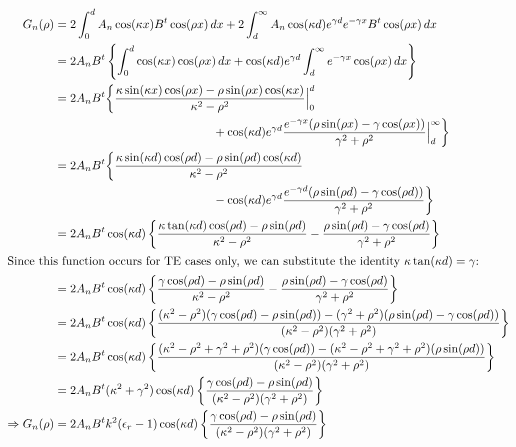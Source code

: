 \documentclass[11pt, oneside]{article}   	%
\begin{document}
\begin{align*}
G_{n}(\rho) &= 2 \int_{0}^{d} A_{n}\cos(\kappa x) B^{t}\cos(\rho x) \, dx + 2\int_{d}^{\infty} A_{n}\cos(\kappa d)e^{\gamma d}e^{-\gamma x} B^{t}\cos(\rho x) \, dx \\
&= 2A_{n}B^{t} \left\{ \int_{0}^{d} \cos(\kappa x) \cos(\rho x) \, dx + \cos(\kappa d)e^{\gamma d} \int_{d}^{\infty} e^{-\gamma x} \cos(\rho x) \, dx \right\} \\
&= 2A_{n}B^{t} \bigg\{ \frac{\kappa\sin(\kappa x) \cos(\rho x) - \rho\sin(\rho x) \cos(\kappa x)}{\kappa^{2}-\rho^{2}} \Big|_{0}^{d}  \\
	&\hspace{132px} {} + \cos(\kappa d)e^{\gamma d} \frac{e^{-\gamma x}(\rho \sin(\rho x) - \gamma \cos(\rho x))}{\gamma^{2} + \rho^{2}} \Big|_{d}^{\infty}  \bigg\} \\
&= 2A_{n}B^{t} \bigg\{ \frac{\kappa\sin(\kappa d) \cos(\rho d) - \rho\sin(\rho d) \cos(\kappa d)}{\kappa^{2}-\rho^{2}}  \\
	&\hspace{132px} {} - \cos(\kappa d)e^{\gamma d} \frac{e^{-\gamma d}(\rho \sin(\rho d) - \gamma \cos(\rho d))}{\gamma^{2} + \rho^{2}}  \bigg\} \\
&= 2A_{n}B^{t} \cos(\kappa d) \left\{ \frac{\kappa \tan(\kappa d) \cos(\rho d)  - \rho \sin(\rho d)}{\kappa^{2}-\rho^{2}} 
	- \frac{\rho \sin(\rho d) - \gamma \cos(\rho d)}{\gamma^{2} + \rho^{2}}  \right\} \\
\intertext{Since this function occurs for TE cases only, we can substitute the identity $\kappa \tan (\kappa d) = \gamma$:} 
&= 2A_{n}B^{t} \cos(\kappa d) \left\{ \frac{\gamma \cos(\rho d)  - \rho \sin(\rho d)}{\kappa^{2}-\rho^{2}} 
	- \frac{\rho \sin(\rho d) - \gamma \cos(\rho d)}{\gamma^{2} + \rho^{2}}  \right\} \\
&= 2A_{n}B^{t} \cos(\kappa d) \left\{ \frac{(\kappa^{2} - \rho^{2})(\gamma \cos(\rho d)  - \rho \sin(\rho d)) - (\gamma^{2} + \rho^{2})(\rho \sin(\rho d) - \gamma \cos(\rho d))}{(\kappa^{2}-\rho^{2})(\gamma^{2} + \rho^{2})} \right\} \\
&= 2A_{n}B^{t} \cos(\kappa d) \left\{ \frac{(\kappa^{2} - \rho^{2} + \gamma^{2} + \rho^{2})(\gamma \cos(\rho d)) - (\kappa^{2} - \rho^{2} + \gamma^{2} + \rho^{2})(\rho \sin(\rho d))}{(\kappa^{2}-\rho^{2})(\gamma^{2} + \rho^{2})} \right\} \\
&= 2A_{n}B^{t} (\kappa^{2} + \gamma^{2}) \cos(\kappa d) \left\{ \frac{\gamma \cos(\rho d) - \rho \sin(\rho d)}{(\kappa^{2}-\rho^{2})(\gamma^{2} + \rho^{2})} \right\} \\
\Rightarrow G_{n}(\rho) &= 2A_{n}B^{t} k^{2}(\epsilon_{r} - 1) \cos(\kappa d) \left\{ \frac{\gamma \cos(\rho d) - \rho \sin(\rho d)}{(\kappa^{2}-\rho^{2})(\gamma^{2} + \rho^{2})} \right\}
\end{align*}
\end{document}
